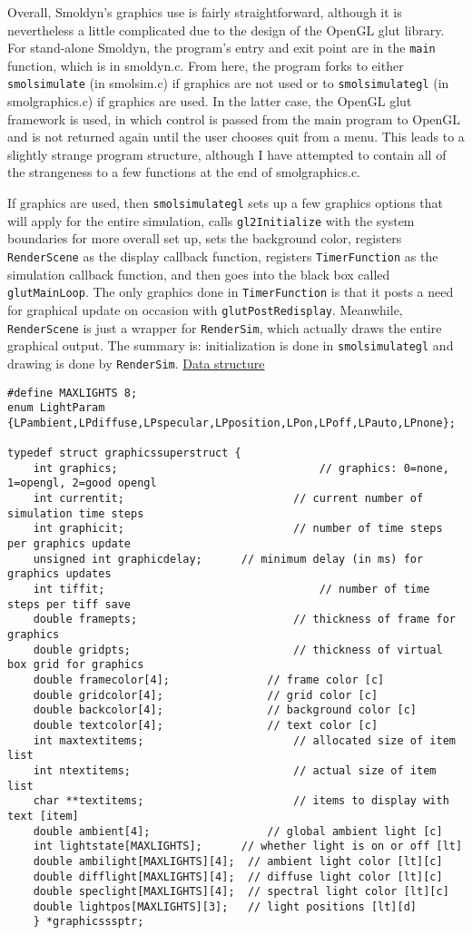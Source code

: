 \documentclass {book}
\begin{document}
Overall, Smoldyn's graphics use is fairly straightforward, although it is nevertheless a little complicated due to the design of the OpenGL glut library.  For stand-alone Smoldyn, the program's entry and exit point are in the \texttt{main} function, which is in smoldyn.c.  From here, the program forks to either \texttt{smolsimulate} (in smolsim.c) if graphics are not used or to \texttt{smolsimulategl} (in smolgraphics.c) if graphics are used.  In the latter case, the OpenGL glut framework is used, in which control is passed from the main program to OpenGL and is not returned again until the user chooses quit from a menu.  This leads to a slightly strange program structure, although I have attempted to contain all of the strangeness to a few functions at the end of smolgraphics.c.

If graphics are used, then \texttt{smolsimulategl} sets up a few graphics options that will apply for the entire simulation, calls \texttt{gl2Initialize} with the system boundaries for more overall set up, sets the background color, registers \texttt{RenderScene} as the display callback function, registers \texttt{TimerFunction} as the simulation callback function, and then goes into the black box called \texttt{glutMainLoop}.  The only graphics done in \texttt{TimerFunction} is that it posts a need for graphical update on occasion with \texttt{glutPostRedisplay}.  Meanwhile, \texttt{RenderScene} is just a wrapper for \texttt{RenderSim}, which actually draws the entire graphical output.  The summary is: initialization is done in \texttt{smolsimulategl} and drawing is done by \texttt{RenderSim}.
\newline
\newline
\underline{Data structure}

\begin{lstlisting}
#define MAXLIGHTS 8;
enum LightParam {LPambient,LPdiffuse,LPspecular,LPposition,LPon,LPoff,LPauto,LPnone};

typedef struct graphicssuperstruct {
	int graphics;								// graphics: 0=none, 1=opengl, 2=good opengl
	int currentit;							// current number of simulation time steps
	int graphicit;							// number of time steps per graphics update
	unsigned int graphicdelay;		// minimum delay (in ms) for graphics updates
	int tiffit;									// number of time steps per tiff save
	double framepts;						// thickness of frame for graphics
	double gridpts;							// thickness of virtual box grid for graphics
	double framecolor[4];				// frame color [c]
	double gridcolor[4];				// grid color [c]
	double backcolor[4];				// background color [c]
	double textcolor[4];				// text color [c]
	int maxtextitems;						// allocated size of item list
	int ntextitems;							// actual size of item list
	char **textitems;						// items to display with text [item]
	double ambient[4];					// global ambient light [c]
	int lightstate[MAXLIGHTS];		// whether light is on or off [lt]
	double ambilight[MAXLIGHTS][4];	 // ambient light color [lt][c]
	double difflight[MAXLIGHTS][4];	 // diffuse light color [lt][c]
	double speclight[MAXLIGHTS][4];	 // spectral light color [lt][c]
	double lightpos[MAXLIGHTS][3];	 // light positions [lt][d]
	} *graphicsssptr;
\end{lstlisting}
\end{document}
